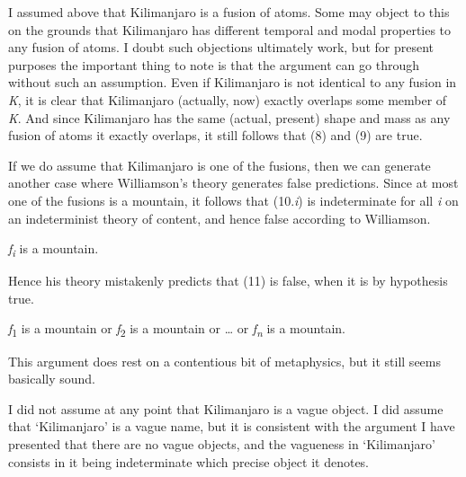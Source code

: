 \documentclass[
  11pt,
  letterpaper,
  DIV=11,
  numbers=noendperiod,
  twoside]{scrartcl}
\providecommand{\tightlist}{%
  \setlength{\itemsep}{0pt}\setlength{\parskip}{0pt}}
\begin{document}
I assumed above that Kilimanjaro is a fusion of atoms. Some may object
to this on the grounds that Kilimanjaro has different temporal and modal
properties to any fusion of atoms. I doubt such objections ultimately
work, but for present purposes the important thing to note is that the
argument can go through without such an assumption. Even if Kilimanjaro
is not identical to any fusion in \emph{K}, it is clear that Kilimanjaro
(actually, now) exactly overlaps some member of \emph{K}. And since
Kilimanjaro has the same (actual, present) shape and mass as any fusion
of atoms it exactly overlaps, it still follows that (8) and (9) are
true.

If we do assume that Kilimanjaro is one of the fusions, then we can
generate another case where Williamson's theory generates false
predictions. Since at most one of the fusions is a mountain, it follows
that (10.\emph{i}) is indeterminate for all \emph{i} on an indeterminist
theory of content, and hence false according to Williamson.

\begin{description}
\tightlist
\item[(10.\emph{i})]
\emph{f\textsubscript{i}} is a mountain.
\end{description}

Hence his theory mistakenly predicts that (11) is false, when it is by
hypothesis true.

\begin{description}
\tightlist
\item[(11)]
\emph{f}\textsubscript{1} is a mountain or \emph{f}\textsubscript{2} is
a mountain or \ldots{} or \emph{f\textsubscript{n}} is a mountain.
\end{description}

This argument does rest on a contentious bit of metaphysics, but it
still seems basically sound.

I did not assume at any point that Kilimanjaro is a vague object. I did
assume that `Kilimanjaro' is a vague name, but it is consistent with the
argument I have presented that there are no vague objects, and the
vagueness in `Kilimanjaro' consists in it being indeterminate which
precise object it denotes.
\end{document}
